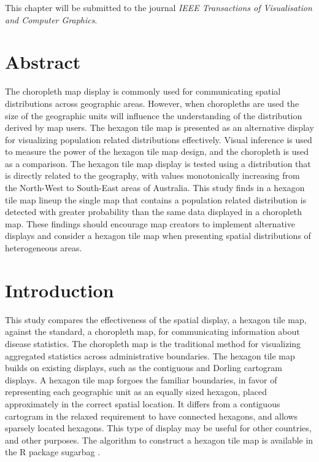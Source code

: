 \documentclass{monashthesis}
\begin{document}
This chapter will be submitted to the journal \emph{IEEE Transactions of Visualisation and Computer Graphics}.

\hypertarget{abstract4}{%
\section*{Abstract}\label{abstract4}}

The choropleth map display is commonly used for communicating spatial distributions across geographic areas. However, when choropleths are used the size of the geographic units will influence the understanding of the distribution derived by map users. The hexagon tile map is presented as an alternative display for visualizing population related distributions effectively. Visual inference is used to measure the power of the hexagon tile map design, and the choropleth is used as a comparison. The hexagon tile map display is tested using a distribution that is directly related to the geography, with values monotonically increasing from the North-West to South-East areas of Australia. This study finds in a hexagon tile map lineup the single map that contains a population related distribution is detected with greater probability than the same data displayed in a choropleth map. These findings should encourage map creators to implement alternative displays and consider a hexagon tile map when presenting spatial distributions of heterogeneous areas.

\hypertarget{intro4}{%
\section{Introduction}\label{intro4}}

This study compares the effectiveness of the spatial display, a hexagon tile map, against the standard, a choropleth map, for communicating information about disease statistics. The choropleth map is the traditional method for visualizing aggregated statistics across administrative boundaries. The hexagon tile map builds on existing displays, such as the contiguous and Dorling cartogram displays. A hexagon tile map forgoes the familiar boundaries, in favor of representing each geographic unit as an equally sized hexagon, placed approximately in the correct spatial location. It differs from a contiguous cartogram in the relaxed requirement to have connected hexagons, and allows sparsely located hexagons. This type of display may be useful for other countries, and other purposes. The algorithm to construct a hexagon tile map is available in the R package sugarbag \autocite{sugarbag}.
\end{document}

